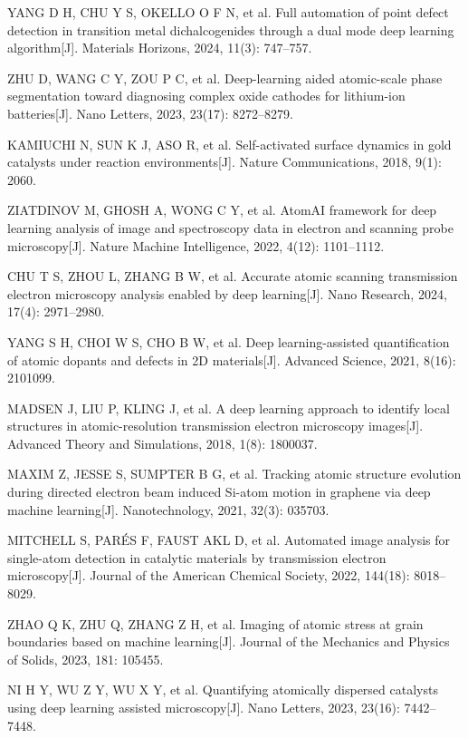 YANG D H, CHU Y S, OKELLO O F N, et al. Full automation of point defect detection in transition metal dichalcogenides through a dual mode deep learning algorithm[J]. Materials Horizons, 2024, 11(3): 747--757.

ZHU D, WANG C Y, ZOU P C, et al. Deep-learning aided atomic-scale phase segmentation toward diagnosing complex oxide cathodes for lithium-ion batteries[J]. Nano Letters, 2023, 23(17): 8272--8279.

KAMIUCHI N, SUN K J, ASO R, et al. Self-activated surface dynamics in gold catalysts under reaction environments[J]. Nature Communications, 2018, 9(1): 2060.

ZIATDINOV M, GHOSH A, WONG C Y, et al. AtomAI framework for deep learning analysis of image and spectroscopy data in electron and scanning probe microscopy[J]. Nature Machine Intelligence, 2022, 4(12): 1101--1112.

CHU T S, ZHOU L, ZHANG B W, et al. Accurate atomic scanning transmission electron microscopy analysis enabled by deep learning[J]. Nano Research, 2024, 17(4): 2971--2980.

YANG S H, CHOI W S, CHO B W, et al. Deep learning-assisted quantification of atomic dopants and defects in 2D materials[J]. Advanced Science, 2021, 8(16): 2101099.

MADSEN J, LIU P, KLING J, et al. A deep learning approach to identify local structures in atomic-resolution transmission electron microscopy images[J]. Advanced Theory and Simulations, 2018, 1(8): 1800037.

MAXIM Z, JESSE S, SUMPTER B G, et al. Tracking atomic structure evolution during directed electron beam induced Si-atom motion in graphene via deep machine learning[J]. Nanotechnology, 2021, 32(3): 035703.

MITCHELL S, PARÉS F, FAUST AKL D, et al. Automated image analysis for single-atom detection in catalytic materials by transmission electron microscopy[J]. Journal of the American Chemical Society, 2022, 144(18): 8018--8029.

ZHAO Q K, ZHU Q, ZHANG Z H, et al. Imaging of atomic stress at grain boundaries based on machine learning[J]. Journal of the Mechanics and Physics of Solids, 2023, 181: 105455.

NI H Y, WU Z Y, WU X Y, et al. Quantifying atomically dispersed catalysts using deep learning assisted microscopy[J]. Nano Letters, 2023, 23(16): 7442--7448.

